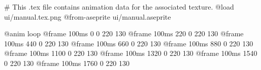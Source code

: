 # This .tex file contains animation data for the associated texture.
@load ui/manual.tex.png
@from-aseprite ui/manual.aseprite

@anim loop
	@frame 100ms 0 0 220 130
	@frame 100ms 220 0 220 130
	@frame 100ms 440 0 220 130
	@frame 100ms 660 0 220 130
	@frame 100ms 880 0 220 130
	@frame 100ms 1100 0 220 130
	@frame 100ms 1320 0 220 130
	@frame 100ms 1540 0 220 130
	@frame 100ms 1760 0 220 130
